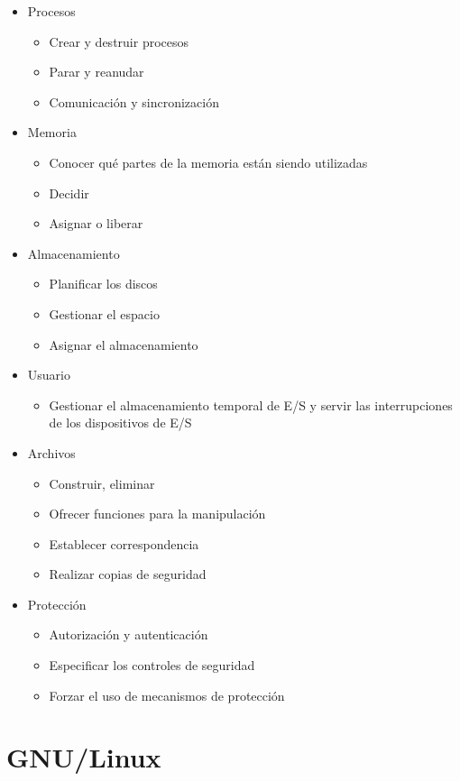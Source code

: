 \documentclass[12pt,a4paper]{report}
\begin{document}
\begin{itemize}
	\item Procesos
	\begin{itemize}
	\item Crear y destruir procesos
	\item Parar y reanudar
	\item Comunicaci\'{o}n y sincronizaci\'{o}n
	\end{itemize}
	\item Memoria
	\begin{itemize}
	\item Conocer qu\'{e} partes de la memoria est\'{a}n siendo utilizadas
	\item Decidir
	\item Asignar o liberar	
	\end{itemize}
	\item Almacenamiento
	\begin{itemize}
	\item Planificar los discos
	\item Gestionar el espacio
	\item Asignar el almacenamiento	
	\end{itemize}
	\item Usuario
	\begin{itemize}
	\item Gestionar el almacenamiento temporal de E/S y servir las 					interrupciones de los dispositivos de E/S	
	\end{itemize}
	\item Archivos
	\begin{itemize}
	\item Construir, eliminar
	\item Ofrecer funciones para la manipulaci\'{o}n
	\item Establecer correspondencia
	\item Realizar copias de seguridad	
	\end{itemize}
	\item Protecci\'{o}n
	\begin{itemize}
	\item Autorizaci\'{o}n y autenticaci\'{o}n
	\item Especificar los controles de seguridad
	\item Forzar el uso de mecanismos de protecci\'{o}n	
	\end{itemize}
\end{itemize}

\chapter{GNU/Linux}
\end{document}
